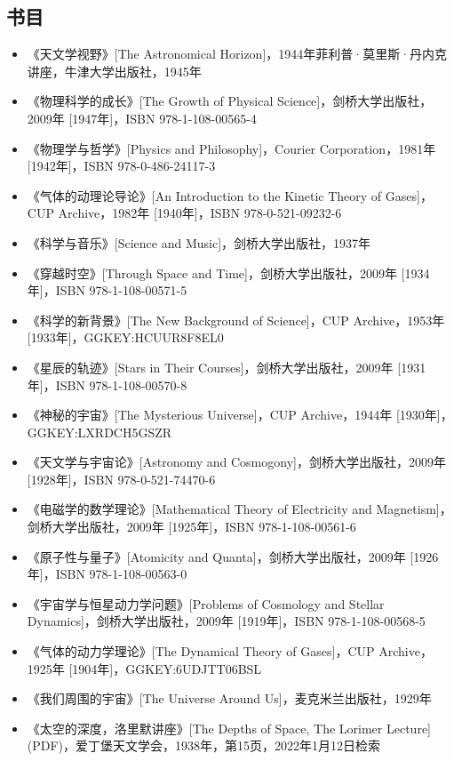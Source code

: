 \subsection{书目}  
\begin{itemize}
\item 《天文学视野》[The Astronomical Horizon]，1944年菲利普·莫里斯·丹内克讲座，牛津大学出版社，1945年  
\item 《物理科学的成长》[The Growth of Physical Science]，剑桥大学出版社，2009年 [1947年]，ISBN 978-1-108-00565-4  
\item 《物理学与哲学》[Physics and Philosophy]，Courier Corporation，1981年 [1942年]，ISBN 978-0-486-24117-3  
\item 《气体的动理论导论》[An Introduction to the Kinetic Theory of Gases]，CUP Archive，1982年 [1940年]，ISBN 978-0-521-09232-6  
\item 《科学与音乐》[Science and Music]，剑桥大学出版社，1937年  
\item 《穿越时空》[Through Space and Time]，剑桥大学出版社，2009年 [1934年]，ISBN 978-1-108-00571-5  
\item 《科学的新背景》[The New Background of Science]，CUP Archive，1953年 [1933年]，GGKEY:HCUUR8F8EL0  
\item 《星辰的轨迹》[Stars in Their Courses]，剑桥大学出版社，2009年 [1931年]，ISBN 978-1-108-00570-8  
\item 《神秘的宇宙》[The Mysterious Universe]，CUP Archive，1944年 [1930年]，GGKEY:LXRDCH5GSZR  
\item 《天文学与宇宙论》[Astronomy and Cosmogony]，剑桥大学出版社，2009年 [1928年]，ISBN 978-0-521-74470-6  
\item 《电磁学的数学理论》[Mathematical Theory of Electricity and Magnetism]，剑桥大学出版社，2009年 [1925年]，ISBN 978-1-108-00561-6  
\item 《原子性与量子》[Atomicity and Quanta]，剑桥大学出版社，2009年 [1926年]，ISBN 978-1-108-00563-0  
\item 《宇宙学与恒星动力学问题》[Problems of Cosmology and Stellar Dynamics]，剑桥大学出版社，2009年 [1919年]，ISBN 978-1-108-00568-5  
\item 《气体的动力学理论》[The Dynamical Theory of Gases]，CUP Archive，1925年 [1904年]，GGKEY:6UDJTT06BSL  
\item 《我们周围的宇宙》[The Universe Around Us]，麦克米兰出版社，1929年  
\item 《太空的深度，洛里默讲座》[The Depths of Space, The Lorimer Lecture] (PDF)，爱丁堡天文学会，1938年，第15页，2022年1月12日检索
\end{itemize}
